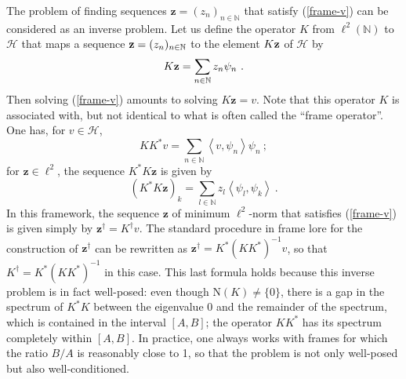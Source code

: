 \documentclass[10pt]{article}
\def\N{\mathbb{N}}
\def\cH{\mathcal{H}}
\def\mN{\mbox{N}}
\newcommand\eref[1]{(\ref{#1})}
\begin{document}
The problem of finding sequences
$\mathbf{z}=(z_n)_{n \in \N}$ that satisfy \eref{frame-v} can be
considered as an inverse problem. Let us define the operator $K$
from $\ell^2 (\N)$ to $\cH$ that maps a sequence
$\mbox{{\bf z}}= (z_n)_{n \in \N}$ to the element $K \mbox{{\bf z}}$ of $\cH$
by
\begin{equation*}
K \mbox{{\bf z}} = \sum_{n \in \N} z_n \psi_n ~.
\end{equation*}
Then solving \eref{frame-v} amounts to solving $K\mathbf{z}=v$. Note
that
this operator $K$ is associated with, but not identical to
what is often called the ``frame operator''. One has, for
$v \in \cH$,
$$
K K^* v = \sum_{n \in \N} \left<v, \psi_n \right> \psi_n~ ;
$$
for $\mathbf{z} \in \ell^2$, the sequence $K^*K\mathbf{z}$ is given by
$$
(K^*K \mathbf{z})_k = \sum_{l \in \N} z_l \left< \psi_l, \psi_k \right> ~.
$$
In this framework, the sequence $\mathbf{z}$ of minimum
$\ell^2$-norm that satisfies \eref{frame-v} is given simply by
$\mathbf{z}^{\dagger}= K^{\dagger}v$. The standard procedure in frame
lore
for the construction of $\mathbf{z}^{\dagger}$ can be rewritten as
$\mathbf{z}^{\dagger}=K^*(KK^*)^{-1}v$, so that
$K^{\dagger}=K^*(KK^*)^{-1}$
in this case. This last formula holds because this inverse problem is
in fact well-posed: even though $\mN(K) \neq \{0\}$, there is a gap
in the spectrum of $K^*K$ between the eigenvalue 0 and the remainder
of the spectrum, which is contained in the interval $[A,B]$; the
operator
$KK^*$ has its spectrum completely within $[A,B]$. In practice, one
always
works with frames for which the ratio $B/A$ is reasonably close to 1, so
that the problem is not only well-posed but also well-conditioned.
\end{document}
